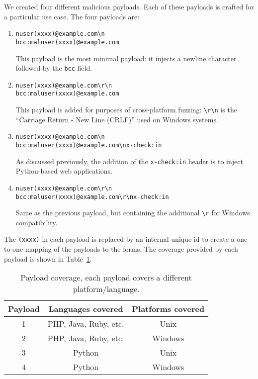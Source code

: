We created four different malicious payloads. Each of these payloads is crafted for a particular use case. The four payloads are:

\begin{enumerate}
	\item
	\texttt{nuser(xxxx)@example.com\textbackslash{}n\\bcc:maluser(xxxx)@example.com} 
	
	This payload is the most minimal payload: it injects a newline character followed by the \texttt{bcc} field.
	
	\item \texttt{nuser(xxxx)@example.com\textbackslash{}r\textbackslash{}n\\bcc:maluser(xxxx)@example.com}
	
	This payload is added for purposes of cross-platform fuzzing: \texttt{\textbackslash{}r\textbackslash{}n} is the ``Carriage Return - New Line (CRLF)'' used on Windows systems. %
	
	\item \texttt{nuser(xxxx)@example.com\textbackslash{}n\\bcc:maluser(xxxx)@example.com\textbackslash{}nx-check:in}
	
	As discussed previously, the addition of the \texttt{x-check:in} header is to inject Python-based web applications.
	
	\item \texttt{nuser(xxxx)@example.com\textbackslash{}r\textbackslash{}n\\bcc:maluser(xxxx)@example.com\textbackslash{}r\textbackslash{}nx-check:in}
	
	Same as the previous payload, but containing the additional \texttt{\textbackslash{}r} for Windows compatibility.
	
\end{enumerate}
The \texttt{(xxxx)} in each payload is replaced by an internal unique id to create a one-to-one mapping of the payloads to the forms.
The coverage provided by each payload is shown in Table~\ref{tab:payloadcov}.\\

\begin{table}[tbp]
	\centering
	\begin{tabular}{|c|c|c|}
		\hline
		\multicolumn{1}{|c|}{\textbf{Payload}} & \multicolumn{1}{c}{\textbf{Languages covered}} & \multicolumn{1}{|c|}{\textbf{Platforms covered}}\\
		\hline
		1 & PHP, Java, Ruby, etc. & Unix\\
		\hline
		2 & PHP, Java, Ruby, etc. & Windows\\
		\hline
		3 & Python & Unix\\
		\hline
		4 & Python & Windows\\
		\hline
	\end{tabular}
	\caption[]{Payload coverage, each payload covers a different platform/language.}
	\label{tab:payloadcov}
\end{table}

